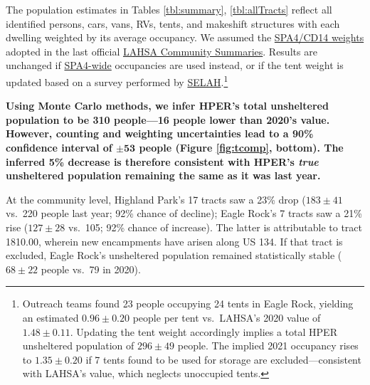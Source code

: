 \documentclass[11pt]{article}
\begin{document}
 The population estimates in Tables \ref{tbl:summary}, \ref{tbl:allTracts} 
reflect all identified persons, cars, vans, RVs, tents, and makeshift structures with each
dwelling weighted by its average occupancy. We assumed the 
\href{https://www.lahsa.org/documents?id=4635-usc-2018-2020-multipliers-and-estimates-overview}
{SPA4/CD14 weights} adopted in the last official 
\href{https://www.lahsa.org/documents?id=4686-2020-greater-los-angeles-city-community-homelessness-report-service-planning-area-4.pdf}{LAHSA Community Summaries}. Results are unchanged if 
\href{https://www.lahsa.org/documents?id=4693-2020-greater-los-angeles-homeless-count-cvrtm-conversion-factors}{SPA4-wide} occupancies are used instead, or if the tent weight is 
updated based on a survey performed by \href{https://www.selahnhc.org/selah-eagle-rock-chapter}
{SELAH}.\footnote{Outreach teams found 23 people occupying 24 tents in Eagle Rock, yielding an 
estimated $0.96\pm 0.20$ people per tent vs.~LAHSA's 2020 value of $1.48\pm0.11$. Updating the tent 
weight accordingly implies a total HPER unsheltered population of $296\pm49$ people. The implied 
2021 occupancy rises to $1.35\pm0.20$ if 7 tents found to be used for storage are excluded---consistent 
with LAHSA's value, which neglects unoccupied tents.}

\textbf{Using Monte Carlo methods, we infer HPER's total unsheltered population to be 
310 people---16 people lower than 2020's value. However, counting and weighting uncertainties lead
to a 90\% confidence interval of $\mathbf{\pm53}$ people (Figure \ref{fig:tcomp}, bottom). The 
inferred 5\% decrease is therefore consistent with HPER's \emph{true} unsheltered population 
remaining the same as it was last year.}

At the community level, Highland Park's 17 tracts saw a 23\% drop ($183\pm41$ vs.~220 people
last year; 92\% chance of decline); Eagle Rock's 7 tracts saw a 21\% rise ($127\pm28$ vs.~105; 92\% 
chance of increase). The latter is attributable to tract 1810.00, wherein new encampments have arisen 
along US 134. If that tract is excluded, Eagle Rock's unsheltered population 
remained statistically stable ($68\pm22$ people vs.~79 in 2020).


\end{document}
